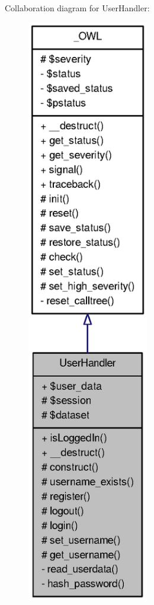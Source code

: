 Collaboration diagram for UserHandler:
\nopagebreak
\begin{figure}[H]
\begin{center}
\leavevmode
\includegraphics[width=150pt]{classUserHandler__coll__graph}
\end{center}
\end{figure}
